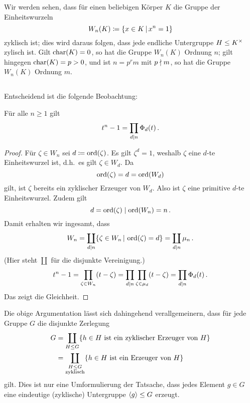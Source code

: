\begin{remark}
  Wir werden sehen, dass für einen beliebigen Körper $K$ die Gruppe der Einheitswurzeln
  \[
              W_n(K)
    \coloneqq \{x \in K \suchthat x^n = 1\}
  \]
  zyklisch ist;
  dies wird daraus folgen, dass jede endliche Untergruppe $H \leq K^\times$ zylisch ist.
  Gilt $\operatorname{char}(K) = 0$, so hat die Gruppe $W_n(K)$ Ordnung $n$;
  gilt hingegen $\operatorname{char}(K) = p > 0$, und ist $n = p^r m$ mit $p \mathrel{\nmid} m$, so hat die Gruppe $W_n(K)$ Ordnung $m$.
\end{remark}





\subsection{}

Entscheidend ist die folgende Beobachtung:

\begin{lemma}
  \label{lemma: decomposition into cyclotomic polynomials}
  Für alle $n \geq 1$ gilt
  \[
      t^n - 1
    = \prod_{d \mathrel{|} n} \Phi_d(t)\,.
  \]
\end{lemma}

\begin{proof}
  Für $\zeta \in W_n$ sei $d \coloneqq \operatorname{ord}(\zeta)$.
  Es gilt $\zeta^d = 1$, weshalb $\zeta$ eine $d$-te Einheitswurzel ist, d.h.\ es gilt $\zeta \in W_d$.
  Da
  \[
      \operatorname{ord}(\zeta)
    = d
    = \operatorname{ord}(W_d)
  \]
  gilt, ist $\zeta$ bereits ein zyklischer Erzeuger von $W_d$.
  Also ist $\zeta$ eine primitive $d$-te Einheitswurzel.
  Zudem gilt
  \[
              d
    =         \operatorname{ord}(\zeta)
    \mathrel{|}  \operatorname{ord}(W_n)
    =         n\,.
  \]
  Damit erhalten wir ingesamt, dass
  \[
      W_n
    = \coprod_{d \divides n} \{ \zeta \in W_n \suchthat \ord{\zeta} = d \}
    = \coprod_{d \divides n} \mu_n\,.
  \]
  (Hier steht $\coprod$ für die disjunkte Vereinigung.)
  \[
      t^n - 1
    = \prod_{\zeta \in W_n} (t - \zeta)
    = \prod_{d \mathrel{|} n} \prod_{\zeta \in \mu_d} (t - \zeta)
    = \prod_{d \mathrel{|} n} \Phi_d(t)\,.
  \]
  Das zeigt die Gleichheit.
\end{proof}

\begin{remark}
  Die obige Argumentation lässt sich dahingehend verallgemeinern, dass für jede Gruppe $G$ die disjunkte Zerlegung
  \begin{align*}
        G
    &=  \coprod_{H \leq G} \{\text{$h \in H$ ist ein zyklischer Erzeuger von $H$}\}  \\
    &=  \coprod_{\substack{H \leq G \\ \text{zyklisch}}} \{\text{$h \in H$ ist ein Erzeuger von $H$}\}
  \end{align*}
  gilt.
  Dies ist nur eine Umformulierung der Tatsache, dass jedes Element $g \in G$ eine eindeutige (zyklische) Untergruppe $\langle g\rangle \leq G$ erzeugt.
\end{remark}


